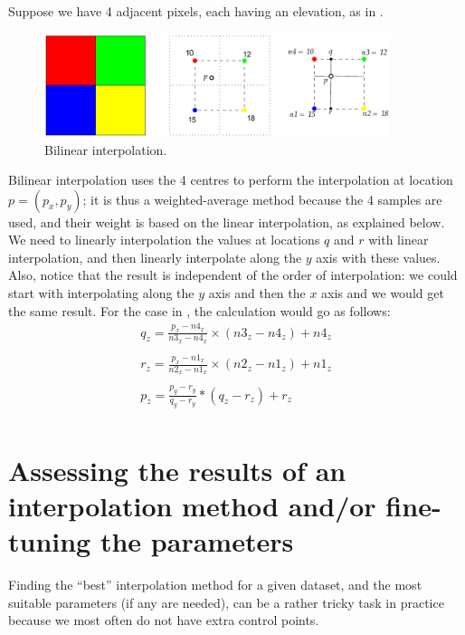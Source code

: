 Suppose we have 4 adjacent pixels, each having an elevation, as in .
\begin{figure}
  \centering
  \includegraphics[width=0.9\textwidth]{figs/bilinear}
  \caption{Bilinear interpolation.} %
\end{figure}
Bilinear interpolation uses the 4 centres to perform the interpolation at location $p = (p_x, p_y)$; it is thus a weighted-average method because the 4 samples are used, and their weight is based on the linear interpolation, as explained below.
We need to linearly interpolation the values at locations $q$ and $r$ with linear interpolation, and then linearly interpolate along the $y$ axis with these values. 
Also, notice that the result is independent of the order of interpolation: we could start with interpolating along the $y$ axis and then the $x$ axis and we would get the same result. 
For the case in , the calculation would go as follows:
\begin{equation}
  \begin{array}{l}
    q_z = \frac{p_x - n4_x}{n3_x - n4_x} \times (n3_z - n4_z) + n4_z \\
   \\
    r_z = \frac{p_x - n1_x}{n2_x - n1_x} \times (n2_z - n1_z) + n1_z \\
    \\
    p_z = \frac{p_y - r_y}{q_y - r_y} * (q_z - r_z) + r_z \\
  \end{array}
\end{equation}


%
\section[Assessing the results]{Assessing the results of an interpolation method and/or fine-tuning the parameters}

Finding the ``best'' interpolation method for a given dataset, and the most suitable parameters (if any are needed), can be a rather tricky task in practice because we most often do not have extra control points.


